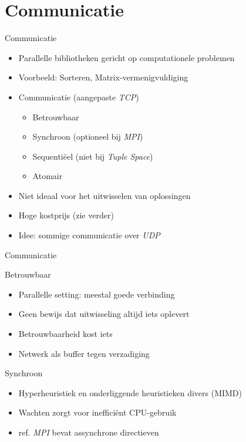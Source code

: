 \documentclass[handout]{beamer}
\begin{document}
\section{Communicatie}
\begin{frame}{Communicatie}
\begin{itemize}[<+->]
 \item Parallelle bibliotheken gericht op computationele problemen
 \item Voorbeeld: Sorteren, Matrix-vermenigvuldiging
 \item Communicatie (aangepaste \emph{TCP})
 \begin{itemize}[<+->]
  \item Betrouwbaar
  \item Synchroon (optioneel bij \emph{MPI})
  \item Sequenti\"eel (niet bij \emph{Tuple Space})
  \item Atomair
 \end{itemize}
 \item Niet ideaal voor het uitwisselen van oplossingen
 \item Hoge kostprijs (zie verder)
 \item Idee: sommige communicatie over \emph{UDP}
\end{itemize}
\end{frame}
\begin{frame}{Communicatie}
\begin{block}{Betrouwbaar}
\begin{itemize}[<+->]
 \item Parallelle setting: meestal goede verbinding
 \item Geen bewijs dat uitwisseling altijd iets oplevert
 \item Betrouwbaarheid kost iets
 \item Netwerk als buffer tegen verzadiging
\end{itemize}
\end{block}
\begin{block}{Synchroon}
\begin{itemize}[<+->]
 \item Hyperheuristiek en onderliggende heuristieken divers (MIMD)
 \item Wachten zorgt voor ineffici\"ent CPU-gebruik
 \item ref. \emph{MPI} bevat assynchrone directieven
\end{itemize}
\end{block}
\end{frame}
\end{document}
